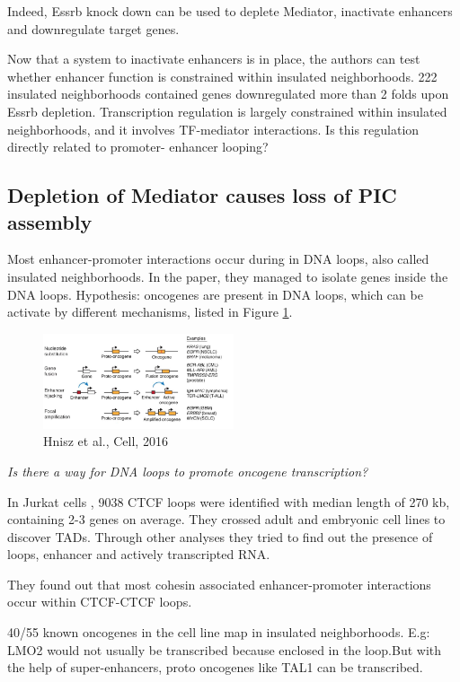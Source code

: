 Indeed, Essrb knock down can be used to deplete Mediator, inactivate enhancers and downregulate target genes.

Now that a system to inactivate enhancers is in place, the authors can test whether enhancer function is constrained within insulated neighborhoods. 222 insulated neighborhoods contained genes downregulated more than 2 folds upon Essrb depletion. Transcription regulation is largely constrained within insulated neighborhoods, and it involves TF-mediator interactions. Is this regulation directly related to promoter- enhancer looping?

\subsection{Depletion of Mediator causes loss of PIC assembly}

Most enhancer-promoter interactions occur during in DNA loops, also called insulated neighborhoods. In the paper, they managed to isolate genes inside the DNA loops.
Hypothesis: oncogenes are present in DNA loops, which can be activate by different mechanisms, listed in Figure \ref{fig:proto}.

\begin{figure}
\centering
\includegraphics[width=0.5\textwidth]{../_resources/4eb79fba5a169cc3d31f5400dee44c80.png}
\caption{Hnisz et al., Cell, 2016}
\label{fig:proto}
\end{figure}

\emph{Is there a way for DNA loops to promote oncogene transcription?}

In Jurkat cells , 9038 CTCF loops were identified with median length of 270 kb, containing 2-3 genes on average. They crossed adult and embryonic cell lines to discover TADs. Through other analyses they tried to find out the presence of loops, enhancer and actively transcripted RNA.

They found out that most cohesin associated enhancer-promoter interactions occur within CTCF-CTCF loops.

40/55 known oncogenes in the cell line map in insulated neighborhoods. E.g: LMO2 would not usually be transcribed because enclosed in the loop.But with the help of super-enhancers, proto oncogenes like TAL1 can be transcribed.

